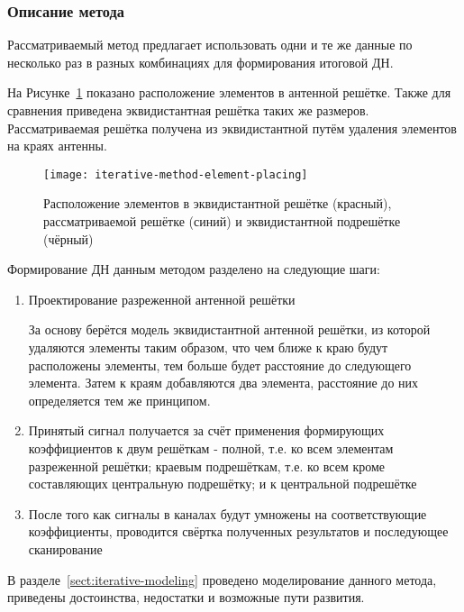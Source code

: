 \subsubsection{Описание метода}

Рассматриваемый метод предлагает использовать одни и те же данные по несколько раз в разных комбинациях для 
формирования итоговой ДН.

На Рисунке~\ref{fig:iterative-method-element-placing} показано расположение элементов в антенной решётке. Также для сравнения 
приведена эквидистантная решётка таких же размеров. Рассматриваемая решётка получена из эквидистантной путём 
удаления элементов на краях антенны. 

\begin{figure}[!ht]
    \centering
    \texttt{[image: iterative-method-element-placing]}
    \caption{Расположение элементов в эквидистантной решётке (красный), рассматриваемой решётке (синий) и эквидистантной подрешётке (чёрный)}%
    \label{fig:iterative-method-element-placing}
\end{figure}

Формирование ДН данным методом разделено на следующие шаги:

\begin{enumerate}
    \item Проектирование разреженной антенной решётки
    
    За основу берётся модель эквидистантной антенной решётки, из которой удаляются элементы таким образом, что чем ближе к 
    краю будут расположены элементы, тем больше будет расстояние до следующего элемента. Затем к краям добавляются 
    два элемента, расстояние до них определяется тем же принципом.
    \item Принятый сигнал получается за счёт применения формирующих коэффициентов к двум решёткам - полной, т.е. ко 
    всем элементам разреженной решётки; краевым подрешёткам, т.е. ко всем кроме составляющих центральную подрешётку; 
    и к центральной подрешётке
    \item После того как сигналы в каналах будут умножены на соответствующие коэффициенты, проводится 
    свёртка полученных результатов и последующее сканирование
\end{enumerate}

В разделе~\ref{sect:iterative-modeling} проведено моделирование данного метода, приведены достоинства, недостатки и возможные пути развития.